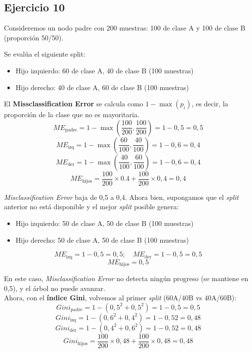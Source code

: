 \documentclass[a4paper,12pt]{article}
\begin{document}
        \subsection*{Ejercicio 10}
            \noindent Consideremos un nodo padre con 200 muestras: 100 de clase A y 100 de clase B (proporción 50/50).

            \noindent Se evalúa el siguiente split:
            \begin{itemize}
                \item Hijo izquierdo: 60 de clase A, 40 de clase B (100 muestras)
                \item Hijo derecho: 40 de clase A, 60 de clase B (100 muestras)
            \end{itemize}

            \noindent El \textbf{Missclassification Error} se calcula como $1 - \max(p_i)$, es decir, la proporción de la clase que no es mayoritaria.
            \[ ME_{\text{padre}} = 1 - \max\left(\frac{100}{200}, \frac{100}{200}\right) = 1 - 0,5 = 0,5 \]
            \[ ME_{\text{izq}} = 1 - \max\left(\frac{60}{100}, \frac{40}{100}\right) = 1 - 0,6 = 0,4 \]
            \[ ME_{\text{der}} = 1 - \max\left(\frac{40}{100}, \frac{60}{100}\right) = 1 - 0,6 = 0,4 \]
            \[ ME_{\text{hijos}} = \frac{100}{200} \times 0.4 + \frac{100}{200} \times 0,4 = 0,4 \]

            \noindent \textit{Misclassification Error} baja de 0,5 a 0,4. Ahora bien, supongamos que el \textit{split} anterior no está disponible y el mejor \textit{split} posible genera:

            \begin{itemize}
                \item Hijo izquierdo: 50 de clase A, 50 de clase B (100 muestras)
                \item Hijo derecho: 50 de clase A, 50 de clase B (100 muestras)
            \end{itemize}

            \[ ME_{\text{izq}} = 1 - 0,5 = 0,5; \quad ME_{\text{der}} = 1 - 0,5 = 0,5 \]
            \[ ME_{\text{hijos}} = 0,5 \]

            \noindent En este caso, \textit{Misclassification Error} no detecta ningún progreso (se mantiene en 0,5), y el árbol no puede avanzar. \\

            \noindent Ahora, con el \textbf{índice Gini}, volvemos al primer \textit{split} (60A/40B vs 40A/60B):
            \[ Gini_{\text{padre}} = 1 - \left(0,5^2 + 0,5^2\right) = 1 - 0,5 = 0,5 \]
            \[ Gini_{\text{izq}} = 1 - \left(0,6^2 + 0,4^2\right) = 1 - 0,52 = 0,48 \]
            \[ Gini_{\text{der}} = 1 - \left(0,4^2 + 0,6^2\right) = 1 - 0,52 = 0,48 \]
            \[ Gini_{\text{hijos}} = \frac{100}{200} \times 0,48 + \frac{100}{200} \times 0,48 = 0,48 \]
\end{document}
